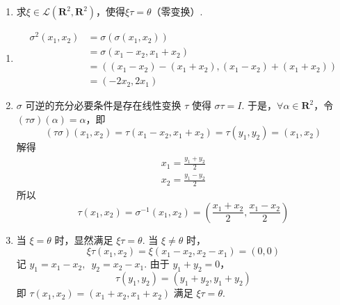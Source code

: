 \begin{exercise}
\begin{exgroup}
\begin{enumerate}
            \item 求$\xi\in \mathcal{L}(\mathbf{R}^2,\mathbf{R}^2)$，使得$\xi\tau=\theta$（零变换）.
        \end{enumerate}

        \begin{answer}
            \begin{enumerate}
                \item \begin{align*}
                          \sigma^2(x_1, x_2) & = \sigma(\sigma(x_1, x_2))                               \\
                                             & = \sigma(x_1 - x_2, x_1 + x_2)                           \\
                                             & = ((x_1 - x_2) - (x_1 + x_2), (x_1 - x_2) + (x_1 + x_2)) \\
                                             & = (-2 x_2, 2 x_1)
                      \end{align*}

                \item $ \sigma $ 可逆的充分必要条件是存在线性变换 $ \tau $ 使得 $ \sigma \tau = I $. 于是，$ \forall \alpha \in \mathbf{R}^2 $，令 $ (\tau \sigma)(\alpha) = \alpha $，即
                      \[ (\tau \sigma)(x_1, x_2) = \tau(x_1 - x_2, x_1 + x_2) = \tau(y_1, y_2) = (x_1, x_2) \]
                      解得
                      \begin{gather*}
                          x_1 = \frac{y_1 + y_2}{2} \\
                          x_2 = \frac{y_1 - y_2}{2}
                      \end{gather*}
                      所以
                      \[ \tau(x_1, x_2) = \sigma^{-1}(x_1, x_2) = \left(\frac{x_1 + x_2}{2}, \frac{x_1 - x_2}{2}\right) \]

                \item 当 $ \xi = \theta $ 时，显然满足 $ \xi \tau = \theta $. 当 $ \xi \neq \theta $ 时，
                      \[ \xi \tau(x_1, x_2) = \xi(x_1 - x_2, x_2 - x_1) = (0, 0) \]
                      记 $ y_1 = x_1 - x_2,\enspace y_2 = x_2 - x_1 $. 由于 $ y_1 + y_2 = 0 $，
                      \[ \tau(y_1, y_2) = (y_1 + y_2, y_1 + y_2) \]
                      即 $ \tau(x_1, x_2) = (x_1 + x_2, x_1 + x_2) $ 满足 $ \xi \tau = \theta $.
            \end{enumerate}

        \end{answer}


\end{exgroup}
\end{exercise}
